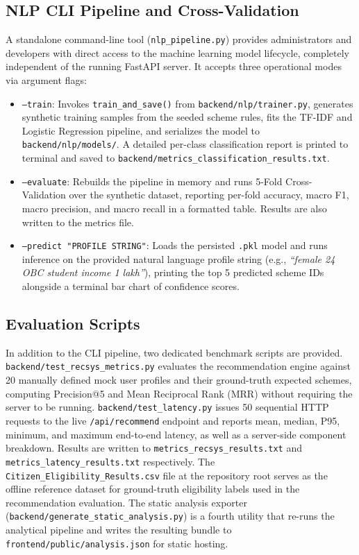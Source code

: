 \documentclass[10pt, journal, twocolumn]{IEEEtran}
\begin{document}
\subsection{NLP CLI Pipeline and Cross-Validation}
A standalone command-line tool (\texttt{nlp\_pipeline.py}) provides administrators and developers with direct access to the machine learning model lifecycle, completely independent of the running FastAPI server. It accepts three operational modes via argument flags:

\begin{itemize}
    \item \texttt{--train}: Invokes \texttt{train\_and\_save()} from \texttt{backend/nlp/trainer.py}, generates synthetic training samples from the seeded scheme rules, fits the TF-IDF and Logistic Regression pipeline, and serializes the model to \texttt{backend/nlp/models/}. A detailed per-class classification report is printed to terminal and saved to \texttt{backend/metrics\_classification\_results.txt}.
    \item \texttt{--evaluate}: Rebuilds the pipeline in memory and runs 5-Fold Cross-Validation over the synthetic dataset, reporting per-fold accuracy, macro F1, macro precision, and macro recall in a formatted table. Results are also written to the metrics file.
    \item \texttt{--predict "PROFILE STRING"}: Loads the persisted \texttt{.pkl} model and runs inference on the provided natural language profile string (e.g., \textit{``female 24 OBC student income 1 lakh''}), printing the top 5 predicted scheme IDs alongside a terminal bar chart of confidence scores.
\end{itemize}

\subsection{Evaluation Scripts}
In addition to the CLI pipeline, two dedicated benchmark scripts are provided. \texttt{backend/test\_recsys\_metrics.py} evaluates the recommendation engine against 20 manually defined mock user profiles and their ground-truth expected schemes, computing Precision@5 and Mean Reciprocal Rank (MRR) \cite{voorhees1999} without requiring the server to be running. \texttt{backend/test\_latency.py} issues 50 sequential HTTP requests to the live \texttt{/api/recommend} endpoint and reports mean, median, P95, minimum, and maximum end-to-end latency, as well as a server-side component breakdown. Results are written to \texttt{metrics\_recsys\_results.txt} and \texttt{metrics\_latency\_results.txt} respectively. The \texttt{Citizen\_Eligibility\_Results.csv} file at the repository root serves as the offline reference dataset for ground-truth eligibility labels used in the recommendation evaluation. The static analysis exporter (\texttt{backend/generate\_static\_analysis.py}) is a fourth utility that re-runs the analytical pipeline and writes the resulting bundle to \texttt{frontend/public/analysis.json} for static hosting.
\end{document}
